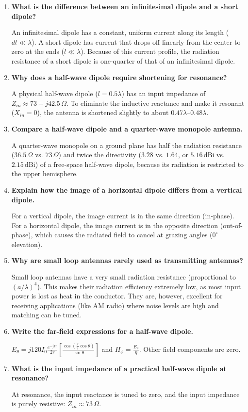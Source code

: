 \documentclass[12pt,a4paper]{article}
\newcommand{\Q}[1]{\textbf{#1}\par\noindent\ignorespaces}
\begin{document}
\begin{tcolorbox}[exambox, title={\textbf{Frequently Asked / Viva Questions}}]
\begin{enumerate}[topsep=0pt, label=\textbf{Q\arabic*.}, itemsep=5pt]
  \item \Q{What is the difference between an infinitesimal dipole and a short dipole?}
    An infinitesimal dipole has a constant, uniform current along its length ($dl \ll \lambda$). A short dipole has current that drops off linearly from the center to zero at the ends ($l \ll \lambda$). Because of this current profile, the radiation resistance of a short dipole is one-quarter of that of an infinitesimal dipole.
  \item \Q{Why does a half-wave dipole require shortening for resonance?}
    A physical half-wave dipole ($l = 0.5\lambda$) has an input impedance of $Z_{in} \approx 73 + j42.5\,\Omega$. To eliminate the inductive reactance and make it resonant ($X_{in} = 0$), the antenna is shortened slightly to about $0.47\lambda$–$0.48\lambda$.
  \item \Q{Compare a half-wave dipole and a quarter-wave monopole antenna.}
    A quarter-wave monopole on a ground plane has half the radiation resistance ($36.5\,\Omega$ vs. $73\,\Omega$) and twice the directivity ($3.28$ vs. $1.64$, or $5.16\,\text{dBi}$ vs. $2.15\,\text{dBi}$) of a free-space half-wave dipole, because its radiation is restricted to the upper hemisphere.
  \item \Q{Explain how the image of a horizontal dipole differs from a vertical dipole.}
    For a vertical dipole, the image current is in the same direction (in-phase). For a horizontal dipole, the image current is in the opposite direction (out-of-phase), which causes the radiated field to cancel at grazing angles ($0^\circ$ elevation).
  \item \Q{Why are small loop antennas rarely used as transmitting antennas?}
    Small loop antennas have a very small radiation resistance (proportional to $(a/\lambda)^4$). This makes their radiation efficiency extremely low, as most input power is lost as heat in the conductor. They are, however, excellent for receiving applications (like AM radio) where noise levels are high and matching can be tuned.
  \item \Q{Write the far-field expressions for a half-wave dipole.}
    $E_\theta = j 120 I_0 \frac{e^{-jkr}}{2 r} \left[ \frac{\cos\left(\frac{\pi}{2}\cos\theta\right)}{\sin\theta} \right]$ and $H_\phi = \frac{E_\theta}{\eta}$. Other field components are zero.
  \item \Q{What is the input impedance of a practical half-wave dipole at resonance?}
    At resonance, the input reactance is tuned to zero, and the input impedance is purely resistive: $Z_{in} \approx 73\,\Omega$.
\end{enumerate}
\end{tcolorbox}
\end{document}
